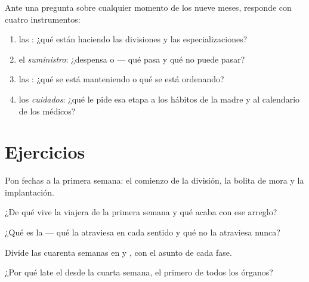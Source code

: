 \begin{method}\label{met:g8:from-egg-to-birth:explain}
Ante una pregunta sobre cualquier momento de los nueve meses, responde
con cuatro instrumentos:
\begin{enumerate}
  \item las \emph{}: ¿qué están haciendo las divisiones y las
        especializaciones?
  \item el \emph{suministro}: ¿despensa o  --- qué pasa y qué
        no puede pasar?
  \item las \emph{}: ¿qué se está manteniendo o qué se está
        ordenando?
  \item los \emph{cuidados}: ¿qué le pide esa etapa a los hábitos de la
        madre y al calendario de los médicos?
\end{enumerate}
\end{method}

\section{Ejercicios}

\begin{exercise}[$\star$]\label{exo:g8:from-egg-to-birth:1}
Pon fechas a la primera semana: el comienzo de la división, la bolita
de mora y la implantación.
\end{exercise}

\begin{exercise}[$\star$]\label{exo:g8:from-egg-to-birth:2}
¿De qué vive la viajera de la primera semana y qué acaba con ese
arreglo?
\end{exercise}

\begin{exercise}[$\star$]\label{exo:g8:from-egg-to-birth:3}
¿Qué es la  --- qué la atraviesa en cada sentido y qué no la
atraviesa nunca?
\end{exercise}

\begin{exercise}[$\star$]\label{exo:g8:from-egg-to-birth:4}
Divide las cuarenta semanas en  y , con el asunto de cada
fase.
\end{exercise}

\begin{exercise}[$\star$]\label{exo:g8:from-egg-to-birth:5}
¿Por qué late el  desde la cuarta semana, el primero de todos
los órganos?
\end{exercise}

